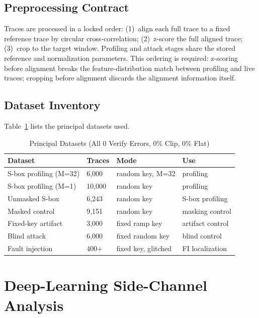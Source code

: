 \documentclass[conference]{IEEEtran}
\begin{document}
\subsection{Preprocessing Contract}

Traces are processed in a locked order: (1)~align each full
trace to a fixed reference trace by circular cross-correlation;
(2)~z-score the full aligned trace; (3)~crop to the target
window. Profiling and attack stages share the stored reference
and normalization parameters. This ordering is required:
z-scoring before alignment breaks the feature-distribution
match between profiling and live traces; cropping before
alignment discards the alignment information itself.

\subsection{Dataset Inventory}

Table~\ref{tab:datasets} lists the principal datasets used.

\begin{table}[htbp]
  \caption{Principal Datasets (All 0 Verify Errors, 0\% Clip,
  0\% Flat)}
  \label{tab:datasets}
  \centering
  \begin{tabular}{llll}
    \toprule
    \textbf{Dataset} & \textbf{Traces} &
    \textbf{Mode} & \textbf{Use} \\
    \midrule
    S-box profiling (M=32) & 6{,}000 & random key, M=32 & profiling \\
    S-box profiling (M=1)  & 10{,}000 & random key & profiling \\
    Unmasked S-box         & 6{,}243 & random key & S-box profiling \\
    Masked control         & 9{,}151 & random key & masking control \\
    Fixed-key artifact     & 3{,}000 & fixed ramp key & artifact control \\
    Blind attack           & 6{,}000 & fixed random key & blind control \\
    Fault injection        & 400+   & fixed key, glitched & FI localization \\
    \bottomrule
  \end{tabular}
\end{table}

\section{Deep-Learning Side-Channel Analysis}
\label{sec:dlsca}
\end{document}
